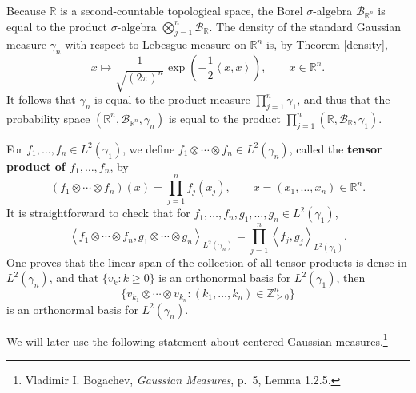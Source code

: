 \documentclass{article}
\newcommand{\inner}[2]{\left\langle #1, #2 \right\rangle}
\theoremstyle{definition}
\theoremstyle{definition}
\begin{document}
Because $\mathbb{R}$ is a second-countable topological space, the Borel $\sigma$-algebra
$\mathscr{B}_{\mathbb{R}^n}$ is equal to the product 
$\sigma$-algebra $\bigotimes_{j=1}^n \mathscr{B}_{\mathbb{R}}$. 
The density of the standard Gaussian measure $\gamma_n$ with respect to Lebesgue measure on
$\mathbb{R}^n$ is, by Theorem \ref{density},
\[
x \mapsto \frac{1}{\sqrt{(2\pi)^n}} \exp\left(-\frac{1}{2}\inner{x}{x} \right), \qquad x \in \mathbb{R}^n.
\]
It follows that $\gamma_n$ is equal to the product measure $\prod_{j=1}^n \gamma_1$, and thus that the probability
space $(\mathbb{R}^n,\mathscr{B}_{\mathbb{R}^n},\gamma_n)$ is equal to the product $\prod_{j=1}^n (\mathbb{R},\mathscr{B}_{\mathbb{R}},
\gamma_1)$. 

For $f_1,\ldots,f_n \in L^2(\gamma_1)$, we define $f_1 \otimes \cdots \otimes f_n \in L^2(\gamma_n)$,
called the \textbf{tensor product of $f_1,\ldots,f_n$}, by
\[
(f_1 \otimes \cdots \otimes f_n)(x) = \prod_{j=1}^n f_j(x_j), \qquad x = (x_1,\ldots,x_n) \in \mathbb{R}^n.
\]
It is straightforward to check that for $f_1,\ldots,f_n,g_1,\ldots,g_n \in L^2(\gamma_1)$,
\[
\inner{f_1\otimes \cdots \otimes f_n}{g_1 \otimes \cdots \otimes g_n}_{L^2(\gamma_n)}
=\prod_{j=1}^n \inner{f_j}{g_j}_{L^2(\gamma_1)}.
\]
One proves that the linear span of the collection of all tensor products is dense in $L^2(\gamma_n)$, and that 
$\{v_k: k \geq 0\}$ is an orthonormal basis for $L^2(\gamma_1)$, then
\begin{equation}
\{v_{k_1} \otimes \cdots \otimes v_{k_n}: (k_1,\ldots,k_n) \in \mathbb{Z}_{\geq 0}^n\}
\label{tensor}
\end{equation}
is an orthonormal basis for $L^2(\gamma_n)$. 


We will later use the following statement about  centered Gaussian measures.\footnote{Vladimir I. Bogachev,
{\em Gaussian Measures}, p.~5, Lemma 1.2.5.}
\end{document}
